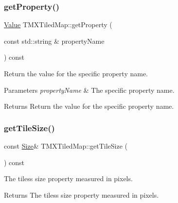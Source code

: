\subsubsection{\texorpdfstring{get\+Property()}{getProperty()}\hspace{0.1cm}{\footnotesize\ttfamily [2/2]}}
{\footnotesize\ttfamily \hyperlink{classValue}{Value} T\+M\+X\+Tiled\+Map\+::get\+Property (\begin{DoxyParamCaption}\item[{const std\+::string \&}]{property\+Name }\end{DoxyParamCaption}) const}

Return the value for the specific property name.


\begin{DoxyParams}{Parameters}
{\em property\+Name} & The specific property name. \\
\hline
\end{DoxyParams}
\begin{DoxyReturn}{Returns}
Return the value for the specific property name. 
\end{DoxyReturn}
\mbox{\label{classTMXTiledMap_ac71f7fdfbb390d3f15b8ed987e52bbaa}} 
\subsubsection{\texorpdfstring{get\+Tile\+Size()}{getTileSize()}\hspace{0.1cm}{\footnotesize\ttfamily [1/2]}}
{\footnotesize\ttfamily const \hyperlink{classSize}{Size}\& T\+M\+X\+Tiled\+Map\+::get\+Tile\+Size (\begin{DoxyParamCaption}{ }\end{DoxyParamCaption}) const\hspace{0.3cm}{\ttfamily [inline]}}

The tiles\textquotesingle{}s size property measured in pixels.

\begin{DoxyReturn}{Returns}
The tiles\textquotesingle{}s size property measured in pixels. 
\end{DoxyReturn}
\mbox{\label{classTMXTiledMap_ac71f7fdfbb390d3f15b8ed987e52bbaa}} 
